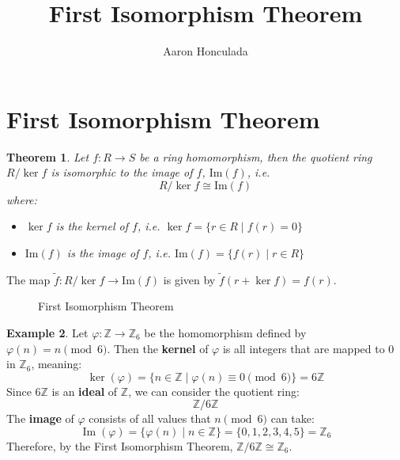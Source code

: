\documentclass{article}
\title{First Isomorphism Theorem}
\author{Aaron Honculada}
\date{\monthname[\month] \the\year}
\theoremstyle{plain} %
\newtheorem{theorem}{Theorem}
\theoremstyle{definition} %
\newtheorem{example}[theorem]{Example}
\begin{document}
\maketitle

\section{First Isomorphism Theorem}
\begin{theorem}
    Let $f: R \to S$ be a ring homomorphism, then the quotient ring $R / \ker f$ is isomorphic to the image of $f$, $\text{Im}(f)$, i.e.
    \[
        R / \ker f \cong \text{Im}(f)
    \]
    where:
    \begin{itemize}
        \item $\ker f$ is the kernel of $f$, i.e. $\ker f = \{ r \in R \mid f(r) = 0 \}$
        \item $\text{Im}(f)$ is the image of $f$, i.e. $\text{Im}(f) = \{ f(r) \mid r \in R \}$
    \end{itemize}
\end{theorem}

The map $\tilde{f}: R / \ker f \to \text{Im}(f)$ is given by $\tilde{f}(r + \ker f) = f(r)$.

\begin{figure}[h]
    \centering
\caption{First Isomorphism Theorem}
\end{figure}

\begin{example}
    Let $\varphi: \mathbb{Z} \to \mathbb{Z}_6$ be the homomorphism defined by $\varphi(n) = n \pmod{6}$.
    Then the \textbf{kernel} of $\varphi$ is all integers that are mapped to 0 in $\mathbb{Z}_6$, meaning:
    \[
        \ker(\varphi) = \{ n \in \mathbb{Z} \mid \varphi(n) \equiv 0 \pmod{6} \} = 6\mathbb{Z}
    \]
    Since $6\mathbb{Z}$ is an \textbf{ideal} of $\mathbb{Z}$, we can consider the quotient ring:
    \[
        \mathbb{Z} / 6\mathbb{Z}
    \]
    The \textbf{image} of $\varphi$ consists of all values that $n \pmod{6}$ can take:
    \[
        \operatorname{Im}(\varphi) = \{ \varphi(n) \mid n \in \mathbb{Z} \} = \{ 0, 1, 2, 3, 4, 5 \} = \mathbb{Z}_6
    \]
    Therefore, by the First Isomorphism Theorem, $\mathbb{Z} / 6\mathbb{Z} \cong \mathbb{Z}_6$.
\end{example}
\end{document}
